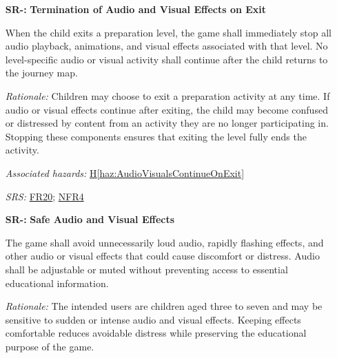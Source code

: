 \documentclass{article}
\newcounter{hazard}
\newcommand{\hazref}[1]{\hyperref[haz:#1]{H\ref*{haz:#1}}}
\newcounter{sr}
\newcommand{\srdef}[1]{\refstepcounter{sr}\label{sr:#1}\textbf{SR-\thesr:}}
\newcommand{\srsurl}{https://team-hindsight.github.io/ophthamology-game/SRS-IEEE/SRS.pdf}
\newcommand{\srsfrref}[2]{\href{\srsurl\#nameddest=#1}{FR#2}}
\newcommand{\srsnfrref}[2]{\href{\srsurl\#nameddest=#1}{NFR#2}}
\begin{document}
\begin{itemize}[leftmargin=1.5cm, labelwidth=1.3cm, labelsep=0.2cm,
  align=left, itemsep=1.2em, parsep=0.6em]
The game shall allow children to skip individual
exercises without losing previously earned points,
coins, or cosmetic rewards. Incorrect responses
and skipped exercises shall not trigger negative
feedback or prevent the child from completing
the preparation level.

\textit{Rationale:}
The application aims to reduce anxiety associated
with ophthalmology examinations. Penalizing children
for incorrect answers or skipped exercises may
cause frustration or discourage participation.
Non-punitive feedback allows children to explore
procedures at their own pace without pressure
to perform correctly.

\textit{Associated hazards:}
\hazref{PunitiveFeedback}

\textit{SRS:} \srsfrref{FR_HintOnMiss}{12}, \srsfrref{FR_NoPenalty}{17}, \srsfrref{FR_FirstReward}{27}

\item[\srdef{StopAudioVisualsOnExit}]
\textbf{Termination of Audio and Visual Effects on Exit}

When the child exits a preparation level, the game
shall immediately stop all audio playback, animations,
and visual effects associated with that level.
No level-specific audio or visual activity shall
continue after the child returns to the journey map.

\textit{Rationale:}
Children may choose to exit a preparation activity
at any time. If audio or visual effects continue
after exiting, the child may become confused or
distressed by content from an activity they are
no longer participating in. Stopping these
components ensures that exiting the level
fully ends the activity.

\textit{Associated hazards:}
\hazref{AudioVisualsContinueOnExit}

\textit{SRS:} \srsfrref{FR_StopOnExit}{20}; \srsnfrref{NFR_Exit}{4}

\item[\srdef{SafeAudioVisuals}]
\textbf{Safe Audio and Visual Effects}

The game shall avoid unnecessarily loud audio,
rapidly flashing effects, and other audio or visual
effects that could cause discomfort or distress.
Audio shall be adjustable or muted without
preventing access to essential educational
information.

\textit{Rationale:}
The intended users are children aged three to
seven and may be sensitive to sudden or intense
audio and visual effects. Keeping effects
comfortable reduces avoidable distress while
preserving the educational purpose of the game.


\end{itemize}
\end{document}
